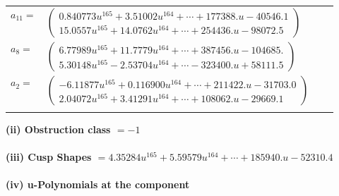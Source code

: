 \documentclass[1p]{elsarticle_modified}
\theoremstyle{definition}
\begin{document}
\begin{tabular}{m{7pt} m{180pt} m{7pt} m{180pt} }
\flushright $a_{11}=$&$\begin{pmatrix}0.840773 u^{165}+3.51002 u^{164}+\cdots+177388. u-40546.1\\15.0557 u^{165}+14.0762 u^{164}+\cdots+254436. u-98072.5\end{pmatrix}$ \\
\flushright $a_{8}=$&$\begin{pmatrix}6.77989 u^{165}+11.7779 u^{164}+\cdots+387456. u-104685.\\5.30148 u^{165}-2.53704 u^{164}+\cdots-323400. u+58111.5\end{pmatrix}$ \\
\flushright $a_{2}=$&$\begin{pmatrix}-6.11877 u^{165}+0.116900 u^{164}+\cdots+211422. u-31703.0\\2.04072 u^{165}+3.41291 u^{164}+\cdots+108062. u-29669.1\end{pmatrix}$\\&\end{tabular}
\flushleft \textbf{(ii) Obstruction class $= -1$}\\~\\
\flushleft \textbf{(iii) Cusp Shapes $= 4.35284 u^{165}+5.59579 u^{164}+\cdots+185940. u-52310.4$}\\~\\
\newpage\renewcommand{\arraystretch}{1}
\flushleft \textbf{(iv) u-Polynomials at the component}\newline \\
\end{document}
